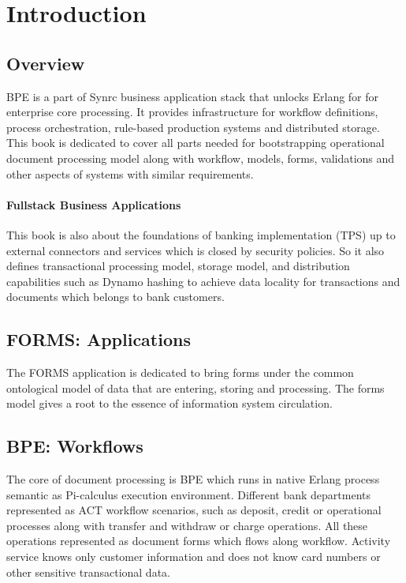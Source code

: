 \section{Introduction}

\subsection{Overview}
BPE is a part of Synrc business application stack that
unlocks Erlang for for enterprise core processing.
It provides infrastructure for workflow definitions, process orchestration,
rule-based production systems and distributed storage. This book is dedicated to cover
all parts needed for bootstrapping operational document processing model along with
workflow, models, forms, validations and other aspects of systems with similar requirements.

\paragraph{Fullstack Business Applications}
This book is also about the foundations of banking implementation (TPS) up to external
connectors and services which is closed by security policies. So it also defines
transactional processing model, storage model, and distribution capabilities such as
Dynamo hashing to achieve data locality for transactions and documents which
belongs to bank customers.

\subsection{FORMS: Applications}
The FORMS application is dedicated to bring forms under the common
ontological model of data that are entering, storing and processing.
The forms model gives a root to the essence of information system circulation.

\subsection{BPE: Workflows}
The core of document processing is BPE which runs in native Erlang process semantic
as Pi-calculus execution environment. Different bank departments represented
as ACT workflow scenarios, such as deposit, credit or operational processes along with
transfer and withdraw or charge operations. All these operations represented
as document forms which flows along workflow. Activity service knows only
customer information and does not know card numbers or other sensitive transactional data.

